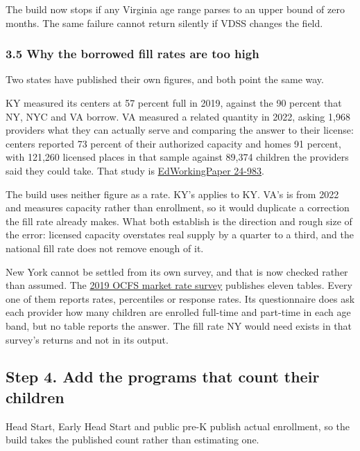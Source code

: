 \documentclass[11pt]{article}
\begin{document}
The build now stops if any Virginia age range parses to an upper bound of zero
months. The same failure cannot return silently if VDSS changes the field.

\subsubsection*{3.5 Why the borrowed fill rates are too high}

Two states have published their own figures, and both point the same way.

KY measured its centers at 57 percent full in 2019, against the 90 percent that
NY, NYC and VA borrow. VA measured a related quantity in 2022, asking 1,968
providers what they can actually serve and comparing the answer to their license:
centers reported 73 percent of their authorized capacity and homes 91 percent,
with 121,260 licensed places in that sample against 89,374 children the providers
said they could take. That study is
\href{https://edworkingpapers.com/ai24-983}{EdWorkingPaper 24-983}.

The build uses neither figure as a rate. KY's applies to KY. VA's is from 2022
and measures capacity rather than enrollment, so it would duplicate a correction
the fill rate already makes. What both establish is the direction and rough size
of the error: licensed capacity overstates real supply by a quarter to a third,
and the national fill rate does not remove enough of it.

New York cannot be settled from its own survey, and that is now checked rather
than assumed. The
\href{https://ocfs.ny.gov/programs/childcare/}{2019 OCFS market rate survey}
publishes eleven tables. Every one of them reports rates, percentiles or
response rates. Its questionnaire does ask each provider how many children are
enrolled full-time and part-time in each age band, but no table reports the
answer. The fill rate NY would need exists in that survey's returns and not in
its output.

\subsection*{Step 4. Add the programs that count their children}

Head Start, Early Head Start and public pre-K publish actual enrollment, so the
build takes the published count rather than estimating one.
\end{document}
